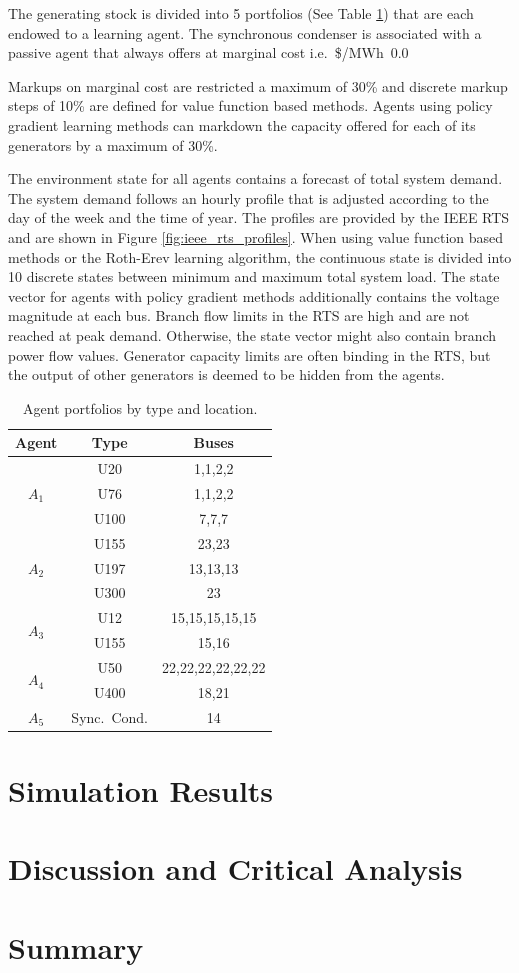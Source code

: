The generating stock is divided into 5 portfolios (See Table
\ref{tbl:agent_portfolios}) that are each endowed to a learning agent.  The
synchronous condenser is associated with a passive agent that always offers
at marginal cost i.e.~\$/MWh~$0.0$

Markups on marginal cost are restricted a maximum of 30\% and discrete markup
steps of 10\% are defined for value function based methods.  Agents using
policy gradient learning methods can markdown the capacity offered for each of
its generators by a maximum of 30\%.

The environment state for all agents contains a forecast of total system
demand.  The system demand follows an hourly profile that is adjusted according
to the day of the week and the time of year.  The profiles are provided by the
IEEE RTS and are shown in Figure \ref{fig:ieee_rts_profiles}.  When using
value function based methods or the Roth-Erev learning algorithm, the
continuous state is divided into 10 discrete states between minimum and maximum
total system load.  The state vector for agents with policy gradient methods
additionally contains the voltage magnitude at each bus.  Branch flow limits in
the RTS are high and are not reached at peak demand.  Otherwise, the state
vector might also contain branch power flow values.  Generator capacity limits
are often binding in the RTS, but the output of other generators is deemed to
be hidden from the agents.

\begin{table}
\begin{center}
\begin{tabular}{c|c|c}
\hline
Agent &Type &\multicolumn{1}{c}{Buses} \\
\hline\hline
\multirow{3}{*}{$A_1$} &U20 &1,1,2,2 \\
 & U76 &1,1,2,2 \\
 & U100 &7,7,7\\
\hline
\multirow{3}{*}{$A_2$} &U155 &23,23 \\
 & U197 &13,13,13 \\
 & U300 &23 \\
\hline
\multirow{2}{*}{$A_3$} &U12 &15,15,15,15,15 \\
 & U155 &15,16 \\
\hline
\multirow{2}{*}{$A_4$} &U50 &22,22,22,22,22,22 \\
 & U400 &18,21 \\
\hline
$A_5$ & Sync.~Cond. &14 \\
\hline
\end{tabular}
\caption{Agent portfolios by type and location.}
\label{tbl:agent_portfolios}
\end{center}
\end{table}


\section{Simulation Results}
\section{Discussion and Critical Analysis}
\label{sec:discuss}
\section{Summary}
